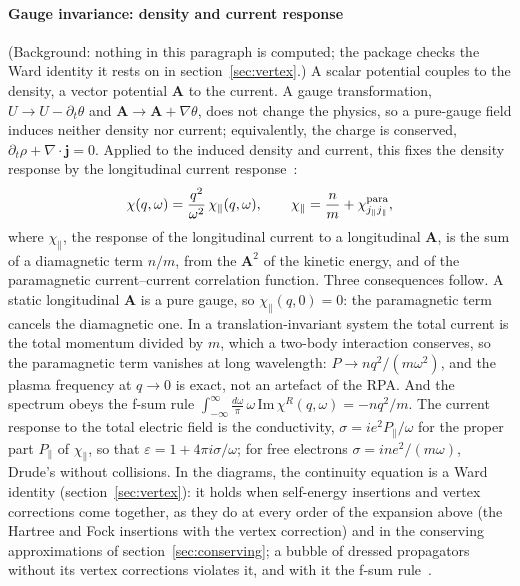 \documentclass[11pt,a4paper]{article}
\begin{document}
\paragraph{Gauge invariance: density and current response} (Background: nothing in this paragraph is computed; the
package checks the Ward identity it rests on in section~\ref{sec:vertex}.) A scalar potential couples to the density, a vector
potential $\mathbf A$ to the current. A gauge transformation, $U\to U-\partial_t\theta$ and
$\mathbf A\to\mathbf A+\nabla\theta$, does not change the physics, so a pure-gauge field induces neither density nor
current; equivalently, the charge is conserved, $\partial_t\rho+\nabla\cdot\mathbf j=0$. Applied to the induced density
and current, this fixes the density response by the longitudinal current response~\cite{GiulianiVignale,Nozieres1964,Mahan}:
\[
\chi(q,\omega)=\frac{q^2}{\omega^2}\,\chi_\parallel(q,\omega),\qquad \chi_\parallel=\frac nm+\chi^{\rm para}_{j_\parallel j_\parallel},
\]
where $\chi_\parallel$, the response of the longitudinal current to a longitudinal $\mathbf A$, is the sum of a diamagnetic
term $n/m$, from the $\mathbf A^2$ of the kinetic energy, and of the paramagnetic current--current correlation
function. Three consequences follow. A static longitudinal $\mathbf A$ is a pure gauge, so $\chi_\parallel(q,0)=0$: the
paramagnetic term cancels the diamagnetic one. In a translation-invariant system the total current is the total
momentum divided by $m$, which a two-body interaction conserves, so the paramagnetic term vanishes at long wavelength:
$P\to nq^2/(m\omega^2)$, and the plasma frequency at $q\to0$ is exact, not an artefact of the RPA. And the
spectrum obeys the f-sum rule $\int_{-\infty}^{\infty}\frac{d\omega}{\pi}\,\omega\,\mathrm{Im}\,\chi^R(q,\omega)=-nq^2/m$.
The current response to the total electric field is the conductivity, $\sigma=ie^2P_\parallel/\omega$ for the proper
part $P_\parallel$ of $\chi_\parallel$, so that $\varepsilon=1+4\pi i\sigma/\omega$; for free electrons $\sigma=ine^2/(m\omega)$, Drude's without
collisions. In the diagrams, the continuity equation is a Ward identity (section~\ref{sec:vertex}): it holds when
self-energy insertions and vertex corrections come together, as they do at every order of the expansion above (the
Hartree and Fock insertions with the vertex correction) and in the conserving approximations of
section~\ref{sec:conserving}; a bubble of dressed propagators without its vertex corrections
violates it, and with it the f-sum rule~\cite{BaymKadanoff1961,Baym1962}.
\end{document}
